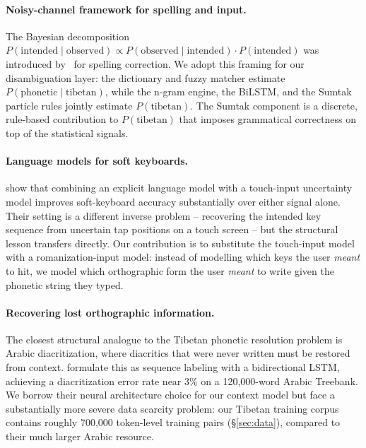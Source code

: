 \documentclass[11pt]{article}
\begin{document}
\paragraph{Noisy-channel framework for spelling and input.}
The Bayesian decomposition $P(\text{intended} \mid \text{observed}) \propto P(\text{observed} \mid \text{intended}) \cdot P(\text{intended})$ was introduced by~\citet{kernighan1990spelling} for spelling correction. We adopt this framing for our disambiguation layer: the dictionary and fuzzy matcher estimate $P(\text{phonetic} \mid \text{tibetan})$, while the n-gram engine, the BiLSTM, and the Sumtak particle rules jointly estimate $P(\text{tibetan})$. The Sumtak component is a discrete, rule-based contribution to $P(\text{tibetan})$ that imposes grammatical correctness on top of the statistical signals.

\paragraph{Language models for soft keyboards.}
\citet{goodman2002softkeyboard} show that combining an explicit language model with a touch-input uncertainty model improves soft-keyboard accuracy substantially over either signal alone. Their setting is a different inverse problem -- recovering the intended key sequence from uncertain tap positions on a touch screen -- but the structural lesson transfers directly. Our contribution is to substitute the touch-input model with a romanization-input model: instead of modelling which keys the user \emph{meant} to hit, we model which orthographic form the user \emph{meant} to write given the phonetic string they typed.

\paragraph{Recovering lost orthographic information.}
The closest structural analogue to the Tibetan phonetic resolution problem is Arabic diacritization, where diacritics that were never written must be restored from context. \citet{belinkov2015arabic} formulate this as sequence labeling with a bidirectional LSTM, achieving a diacritization error rate near 3\% on a 120{,}000-word Arabic Treebank. We borrow their neural architecture choice for our context model but face a substantially more severe data scarcity problem: our Tibetan training corpus contains roughly 700{,}000 token-level training pairs (\S\ref{sec:data}), compared to their much larger Arabic resource.
\end{document}
